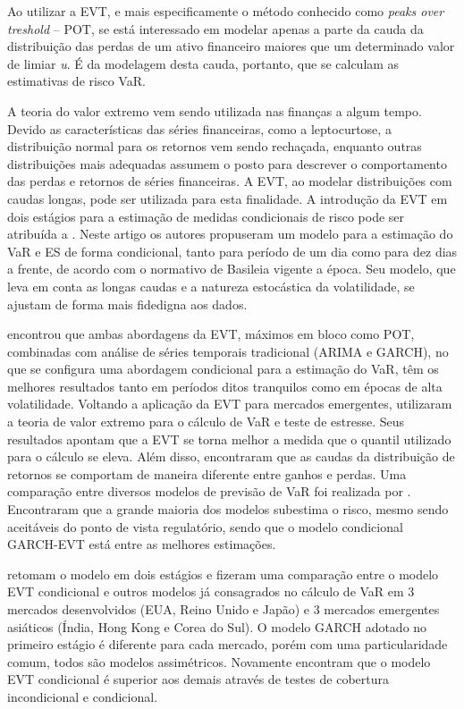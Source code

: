 \documentclass[1p]{elsarticle}
\theoremstyle{definition}
\begin{document}
Ao utilizar a EVT, e mais especificamente o método conhecido como \emph{peaks over treshold} – POT, se está interessado em modelar apenas a parte da cauda da distribuição das perdas de um ativo financeiro maiores que um determinado valor de limiar \emph{u}. É da modelagem desta cauda, portanto, que se calculam as estimativas de risco VaR.

A teoria do valor extremo vem sendo utilizada nas finanças a algum tempo. Devido as características das séries financeiras, como a leptocurtose, a distribuição normal para os retornos vem sendo rechaçada, enquanto outras distribuições mais adequadas assumem o posto para descrever o comportamento das perdas e retornos de séries financeiras. A EVT, ao modelar distribuições com caudas longas, pode ser utilizada para esta finalidade. A introdução da EVT em dois estágios para a estimação de medidas condicionais de risco pode ser atribuída a \cite{McNeil2000}. Neste artigo os autores propuseram um modelo para a estimação do VaR e ES de forma condicional, tanto para período de um dia como para dez dias a frente, de acordo com o normativo de Basileia vigente a época. Seu modelo, que leva em conta as longas caudas e a natureza estocástica da volatilidade, se ajustam de forma mais fidedigna aos dados.

\cite{Bystroem2004} encontrou que ambas abordagens da EVT, máximos em bloco como POT, combinadas com análise de séries temporais tradicional (ARIMA e GARCH), no que se configura uma abordagem condicional para a estimação do VaR, têm os melhores resultados tanto em períodos ditos tranquilos como em épocas de alta volatilidade. Voltando a aplicação da EVT para mercados emergentes, \cite{Gencay2004} utilizaram a teoria de valor extremo para o cálculo de VaR e teste de estresse. Seus resultados apontam que a EVT se torna melhor a medida que o quantil utilizado para o cálculo se eleva. Além disso, encontraram que as caudas da distribuição de retornos se comportam de maneira diferente entre ganhos e perdas. Uma comparação entre diversos modelos de previsão de VaR foi realizada por \cite{Kuester2006}. Encontraram que a grande maioria dos modelos subestima o risco, mesmo sendo aceitáveis do ponto de vista regulatório, sendo que o modelo condicional GARCH-EVT está entre as melhores estimações.


\cite{Karmakar2014} retomam o modelo em dois estágios e fizeram uma comparação entre o modelo EVT condicional e outros modelos já consagrados no cálculo de VaR em 3 mercados desenvolvidos (EUA, Reino Unido e Japão) e 3 mercados emergentes asiáticos (Índia, Hong Kong e Corea do Sul). O modelo GARCH adotado no primeiro estágio é diferente para cada mercado, porém com uma particularidade comum, todos são modelos assimétricos. Novamente encontram que o modelo EVT condicional é superior aos demais através de testes de cobertura incondicional e condicional.
\end{document}
